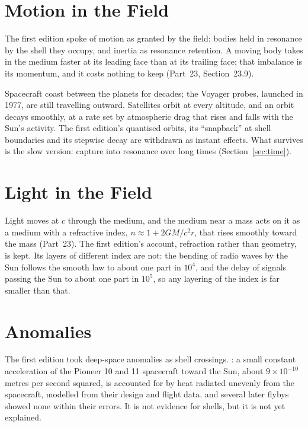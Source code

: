 \documentclass[11pt,a4paper]{article}
\begin{document}
\section{Motion in the Field}
\label{sec:motion}

The first edition spoke of motion as granted by the field: bodies held in resonance by the shell they occupy, and inertia as resonance retention.  A moving body takes in the medium faster at its leading face than at its trailing face; that imbalance is its momentum, and it costs nothing to keep (Part~23, Section~23.9). 

 Spacecraft coast between the planets for decades; the Voyager probes, launched in 1977, are still travelling outward. Satellites orbit at every altitude, and an orbit decays smoothly, at a rate set by atmospheric drag that rises and falls with the Sun's activity. The first edition's quantised orbits, its ``snapback'' at shell boundaries and its stepwise decay are withdrawn as instant effects. What survives is the slow version: capture into resonance over long times (Section~\ref{sec:time}).

\section{Light in the Field}
\label{sec:light}

 Light moves at $c$ through the medium, and the medium near a mass acts on it as a medium with a refractive index, $n \approx 1 + 2GM/c^2 r$, that rises smoothly toward the mass (Part~23). The first edition's account, refraction rather than geometry, is kept. Its layers of different index are not: the bending of radio waves by the Sun follows the smooth law to about one part in $10^4$, and the delay of signals passing the Sun to about one part in $10^5$, so any layering of the index is far smaller than that.

\section{Anomalies}
\label{sec:anomalies}

The first edition took deep-space anomalies as shell crossings. : a small constant acceleration of the Pioneer 10 and 11 spacecraft toward the Sun, about $9\times10^{-10}$ metres per second squared, is accounted for by heat radiated unevenly from the spacecraft, modelled from their design and flight data.  and several later flybys showed none within their errors. It is not evidence for shells, but it is not yet explained.
\end{document}
